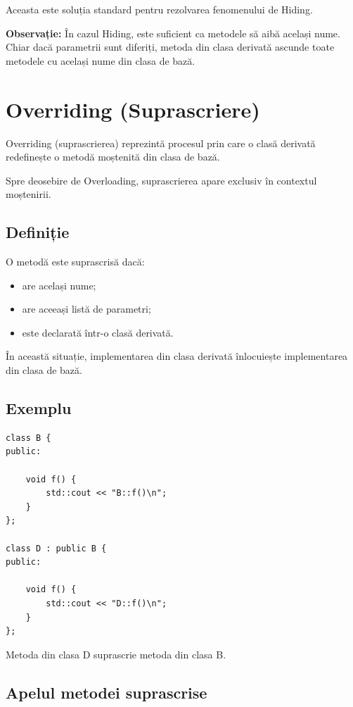 \documentclass[12pt,a4paper]{article}
\begin{document}
Aceasta este soluția standard pentru rezolvarea fenomenului de Hiding.

\textbf{Observație:} În cazul Hiding, este suficient ca metodele să aibă același nume. Chiar dacă parametrii sunt diferiți, metoda din clasa derivată ascunde toate metodele cu același nume din clasa de bază.






\section{Overriding (Suprascriere)}

Overriding (suprascrierea) reprezintă procesul prin care o clasă derivată redefinește o metodă moștenită din clasa de bază.

Spre deosebire de Overloading, suprascrierea apare exclusiv în contextul moștenirii.

\subsection{Definiție}

O metodă este suprascrisă dacă:

\begin{itemize}
\item are același nume;
\item are aceeași listă de parametri;
\item este declarată într-o clasă derivată.
\end{itemize}

În această situație, implementarea din clasa derivată înlocuiește implementarea din clasa de bază.

\subsection{Exemplu}

\begin{verbatim}
class B {
public:

    void f() {
        std::cout << "B::f()\n";
    }
};

class D : public B {
public:

    void f() {
        std::cout << "D::f()\n";
    }
};
\end{verbatim}

Metoda din clasa D suprascrie metoda din clasa B.

\subsection{Apelul metodei suprascrise}
\end{document}
